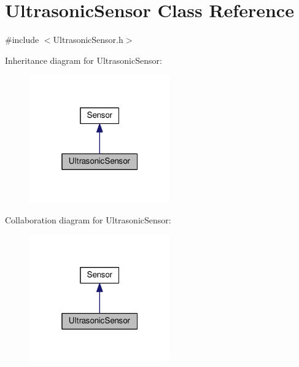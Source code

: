 \hypertarget{classUltrasonicSensor}{\section{Ultrasonic\-Sensor Class Reference}
\label{classUltrasonicSensor}
}


{\ttfamily \#include $<$Ultrasonic\-Sensor.\-h$>$}



Inheritance diagram for Ultrasonic\-Sensor\-:
\nopagebreak
\begin{figure}[H]
\begin{center}
\leavevmode
\includegraphics[width=172pt]{classUltrasonicSensor__inherit__graph}
\end{center}
\end{figure}


Collaboration diagram for Ultrasonic\-Sensor\-:
\nopagebreak
\begin{figure}[H]
\begin{center}
\leavevmode
\includegraphics[width=172pt]{classUltrasonicSensor__coll__graph}
\end{center}
\end{figure}
